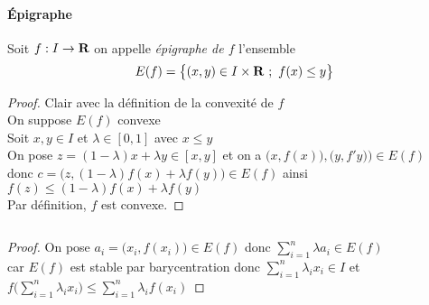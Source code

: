     \paragraph{Épigraphe}
        Soit $f:I\rightarrow {\mathbf{R}}$ on appelle \emph{épigraphe de $f$} l'ensemble \[E(f)=\big\{(x,y)\in I\times{\mathbf{R}} ~;~f(x)\leq y\big\}\]\trait
    \begin{proof}
    \fbox{$\Rightarrow$} Clair avec la définition de la convexité de $f$ \\
    \fbox{$\Leftarrow$} On suppose $E(f)$ convexe \\ Soit $x,y\in I$ et $\lambda\in [0,1] $ avec $x\leq y$ 
    \\On pose $z=(1-\lambda )x + \lambda y \in [x,y]$ et on a $\big( x,f(x)\big) , \big( y,f'y) \big) \in E(f)$ 
    \\ donc $c=\big( z,(1-\lambda )f(x) + \lambda f(y) \big) \in E(f) $ ainsi $ f(z) \leq (1-\lambda )f(x) + \lambda f(y) $ \\ Par 
    définition, $f$ est convexe. \end{proof}
    ${}$ \\ 
    \begin{proof}
    On pose $a_i = \big( x_i ,f(x_i) \big) \in E(f)$ donc $\sum_{i=1}^n \lambda a_i \in E(f)$ \\car $E(f)$ est stable par barycentration 
    donc $\sum_{i=1}^n \lambda_i x_i \in I$ et $f\big( \sum_{i=1}^n \lambda_i x_i \big) \leq \sum_{i=1}^n \lambda_i f(x_i)$
    \end{proof}
    ${}$\\ 
    \vspace*{0.5cm} \\ 

